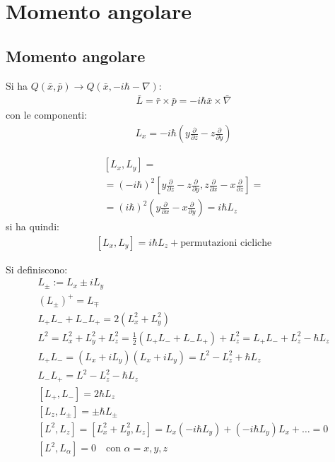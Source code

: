 \chapter{Momento angolare} %
\section{Momento angolare} %
Si ha $Q\left(\bar x,\bar p\right) \rightarrow Q\left(\bar x,-i\hbar -\nabla \right)$:
\begin{equation}\begin{split}
\bar L=\bar r\times \bar p=-i\hbar \bar x\times \bar \nabla 
\end{split}\end{equation}
con le componenti:
\begin{equation}\begin{split}
L_x=-i\hbar \left(y\frac{\partial }{\partial z}-z\frac{\partial }{\partial y}\right)
\end{split}\end{equation}

\begin{equation}\begin{split}
\left[L_x,L_y\right]=\\
=\left(-i\hbar \right)^2\left[y\frac{\partial }{\partial z}-z\frac{\partial }{\partial y},z\frac{\partial }{\partial x}-x\frac{\partial }{\partial z}\right]=\\
=\left(i\hbar \right)^2\left(y\frac{\partial }{\partial x}-x\frac{\partial }{\partial y}\right)=i\hbar L_z
\end{split}\end{equation}
si ha quindi:
\begin{equation}\begin{split}
\left[L_x,L_y\right]=i\hbar L_z + \textrm{permutazioni cicliche}
\end{split}\end{equation}

Si definiscono:
\begin{equation}\begin{split}
L_\pm :=L_x\pm iL_y \\
\left(L_\pm\right)^+=L_\mp \\
L_+L_-+L_-L_+=2\left(L_x^2+L_y^2\right) \\
L^2=L_x^2+L_y^2+L_z^2=\frac{1}{2}\left(L_+L_-+L_-L_+\right)+L_z^2=L_+L_-+L_z^2-\hbar L_z \\
L_+L_-=\left(L_x+iL_y\right)\left(L_x+iL_y\right)=L^2-L_z^2+\hbar L_z \\
L_-L_+=L^2-L_z^2-\hbar L_z \\
\left[L_+,L_-\right]=2\hbar L_z \\
\left[L_z,L_\pm\right]=\pm \hbar L_\pm \\
\left[L^2,L_z\right]=\left[L_x^2+L_y^2,L_z\right]=L_x\left(-i\hbar L_y\right)+\left(-i\hbar L_y\right)L_x+\dots =0 \\
\left[L^2,L_\alpha\right]=0 \quad \textrm{con }\alpha=x,y,z
\end{split}\end{equation}

